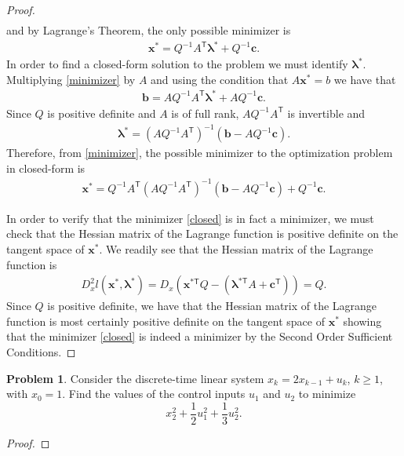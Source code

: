 \documentclass[12pt]{article}
\theoremstyle{definition}
\newtheorem{problem}{Problem}
\newcommand{\vc}[1]{\boldsymbol{#1}}
\newcommand{\tran}{\mathsf{T}}
\begin{document}
\begin{proof}
\begin{align*}
  \end{align*}
  and by Lagrange's Theorem, the only possible minimizer is
  \begin{align}\label{minimizer}
    \vc{x}^{*} = Q^{-1}A^\tran \vc{\lambda}^{*} + Q^{-1}\vc{c}.
  \end{align}
  In order to find a closed-form solution to the problem we must identify $\vc{\lambda}^{*}$. Multiplying
  \eqref{minimizer} by $A$ and using the condition that $A\vc{x}^{*} = b$ we have that
  \begin{align*}
    \vc{b} = AQ^{-1}A^\tran \vc{\lambda}^{*} + AQ^{-1}\vc{c}.
  \end{align*}
  Since $Q$ is positive definite and $A$ is of full rank, $AQ^{-1}A^\tran$ is invertible and
  \begin{align*}
    \vc{\lambda}^{*} = (AQ^{-1}A^\tran)^{-1}(\vc{b} - AQ^{-1}\vc{c}).
  \end{align*}
  Therefore, from \eqref{minimizer}, the possible minimizer to the optimization problem in closed-form is
  \begin{align}\label{closed}
    \vc{x}^{*} = Q^{-1}A^\tran(AQ^{-1}A^\tran)^{-1}(\vc{b} - AQ^{-1}\vc{c}) + Q^{-1}\vc{c}.
  \end{align}

  In order to verify that the minimizer \eqref{closed} is in fact a minimizer,
  we must check that the Hessian matrix of the Lagrange function is positive definite on the tangent space of $\vc{x}^{*}$.
  We readily see that the Hessian matrix of the Lagrange function is
  \begin{align*}
    D^2_x l(\vc{x}^{*}, \vc{\lambda}^{*}) = D_x(\vc{x}^{*\tran} Q - \left(\vc{\lambda}^{*\tran} A + \vc{c}^\tran\right)) = Q.
  \end{align*}
  Since $Q$ is positive definite, we have that the Hessian matrix of the Lagrange function is most certainly
  positive definite on the tangent space of $\vc{x}^{*}$ showing that the minimizer \eqref{closed} is indeed a minimizer by the Second Order Sufficient Conditions.
\end{proof}
\newpage


\begin{problem}
  Consider the discrete-time linear system $x_k = 2 x_{k-1} + u_k$, $k \geq 1$, with
  $x_0 = 1$. Find the values of the control inputs $u_1$ and $u_2$ to minimize
  $$x_2^2 + \frac{1}{2}u_1^2+ \frac{1}{3}u_2^2.$$
\end{problem}

\begin{proof}
\end{proof}
\end{document}
